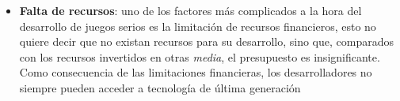 \begin{itemize}
\item \textbf{Falta de recursos}: uno de los factores más complicados a la hora
    del desarrollo de juegos serios es la limitación de recursos financieros,
    esto no quiere decir que no existan recursos para su desarrollo, sino que,
    comparados con los recursos invertidos en otras \textit{media}, el
    presupuesto es insignificante\cite{stapleton2004serious,sg:aoverview}. Como
    consecuencia de las limitaciones financieras, los desarrolladores no siempre
    pueden acceder a tecnología de última generación\cite{stapleton2004serious}


\end{itemize}

